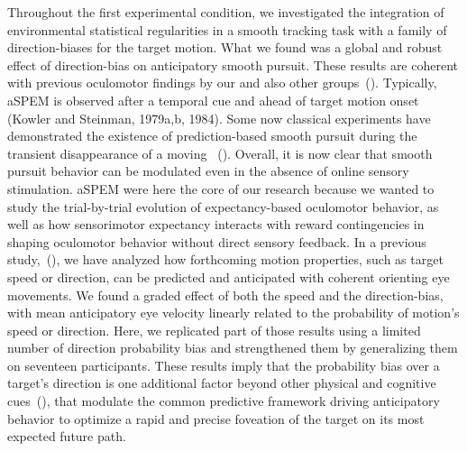 \documentclass[profile,final,english, draft]{article}%
\newcommand{\citep}[1]{(\cite{#1})}
\begin{document}
Throughout the first experimental condition,
we investigated the integration of environmental statistical regularities
in a smooth tracking task with
a family of direction-biases for the target motion.
What we found was a global and robust effect of direction-bias
on anticipatory smooth pursuit.
These results are coherent with previous oculomotor findings
by our and also other groups~\citep{Montagnini2010, SantosKowler2017}.
Typically, aSPEM is observed after a temporal cue and
ahead of target motion onset (Kowler and Steinman, 1979a,b, 1984).
Some now classical experiments have demonstrated the existence
of prediction-based smooth pursuit during
the transient disappearance of a moving ~\citep{Badler2006,BeckerFuchs, 1985}.
Overall, it is now clear that smooth pursuit behavior
can be modulated even in the absence of online sensory stimulation.
aSPEM were here the core of our research because
we wanted to study the trial-by-trial evolution
of expectancy-based oculomotor behavior,
as well as how sensorimotor expectancy interacts
with reward contingencies in shaping oculomotor behavior
without direct sensory feedback.
In a previous study,~\citep{SoutoMontagniniMasson2008, Montagnini2010},
we have analyzed how forthcoming motion properties,
such as target speed or direction, can be
predicted and anticipated with coherent orienting eye movements.
We found a graded effect of both the speed and the direction-bias,
with mean anticipatory eye velocity
linearly related to the probability of motion's speed or direction.
Here, we replicated part of those results
using a limited number of direction probability bias and
strengthened them by generalizing them on seventeen participants.
These results imply that the probability bias over a target's direction is
one additional factor beyond other physical and cognitive cues~\citep{Kowler2014, SantosKowler2017},
that modulate the common predictive framework
driving anticipatory behavior to optimize a rapid and
precise foveation of the target on its most expected future path.

\end{document}
